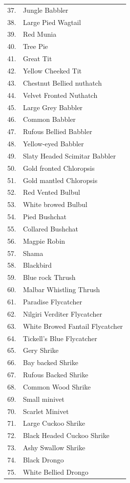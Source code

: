 {\begin{longtable}{cl}
37.	& Jungle Babbler \\
38.	& Large Pied Wagtail \\
39.	& Red Munia \\
40.	& Tree Pie \\
41.	& Great Tit \\
42.	& Yellow Cheeked Tit \\
43.	& Chestnut Bellied nuthatch \\
44.	& Velvet Fronted Nuthatch \\
45.	& Large Grey Babbler \\
46.	& Common Babbler \\
47.	& Rufous Bellied Babbler \\
48. & Yellow-eyed Babbler \\
49. & Slaty Headed Scimitar Babbler \\
50. & Gold fronted Chloropsis \\
51. & Gold mantled Chloropsis \\
52. & Red Vented Bulbul \\
53.	& White browed Bulbul \\
54.	& Pied Bushchat \\
55.	& Collared Bushchat \\
56.	& Magpie Robin \\
57.	& Shama \\
58.	& Blackbird \\
59.	& Blue rock Thrush \\
60.	& Malbar Whistling Thrush \\
61.	& Paradise Flycatcher \\
62.	& Nilgiri Verditer Flycatcher \\
63.	& White Browed Fantail Flycatcher \\
64.	& Tickell's Blue Flycatcher \\
65.	& Gery Shrike \\
66.	& Bay backed Shrike \\
67.	& Rufous Backed Shrike\\ 
68.	& Common Wood Shrike \\
69.	& Small minivet \\
70.	& Scarlet Minivet \\
71.	& Large Cuckoo Shrike \\
72.	& Black Headed Cuckoo Shrike \\
73.	& Ashy Swallow Shrike \\
74.	& Black Drongo \\
75.	& White Bellied Drongo \\

\end{longtable}}
